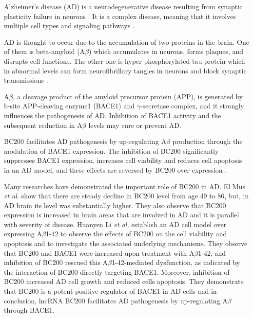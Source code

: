 \documentclass[conference]{IEEEtran}
\begin{document}
Alzheimer's disease (AD) is a neurodegenerative disease resulting from synaptic plasticity failure in neurons \cite{mus2007dendritic}. 
It is a complex disease, meaning that it involves multiple cell types and signaling pathways \cite{zhang2021role}.

AD is thought to occur due to the accumulation of two proteins in the brain. 
One of them is beta-amyloid (A$\beta$) which accumulates in neurons, forms plaques, and disrupts cell functions. 
The other one is hyper-phosphorylated tau protein which in abnormal levels can form neurofibrillary tangles in neurons and block synaptic transmissions \cite{zhang2021role}.

A$\beta$, a cleavage product of the amyloid precursor protein (APP), is generated by b-site APP-cleaving enzyme1 (BACE1) and $\gamma$-secretase complex, and it strongly influences the pathogenesis of AD. 
Inhibition of BACE1 activity and the subsequent reduction in A$\beta$ levels may cure or prevent AD\cite{li2018identification,zhang2021role}.

BC200 facilitates AD pathogenesis by up-regulating A$\beta$ production through the modulation of BACE1 expression. 
The inhibition of BC200 significantly suppresses BACE1 expression, increases cell viability and reduces cell apoptosis in an AD model, and these effects are reversed by BC200 over-expression \cite{li2018identification,zhang2021role}.

Many researches have demonstrated the important role of BC200 in AD. 
El Mus \emph{et al.} \cite{mus2007dendritic} show that there are steady decline in BC200 level from age 49 to 86, but, in AD brain its level was substantially higher. 
They also observe that BC200 expression is increased in brain areas that are involved in AD and it is parallel with severity of disease. 
Huanyen Li \emph{et al.} \cite{li2018identification} establish an AD cell model over expressing A$\beta$1-42 to observe the effects of BC200 on the cell viability and apoptosis and to investigate the associated underlying mechanisms. 
They observe that BC200 and BACE1 were increased upon treatment with A$\beta$1-42, and inhibition of BC200 rescued this A$\beta$1-42-mediated dysfunction, as indicated by the interaction of BC200 directly targeting BACE1. 
Moreover, inhibition of BC200 increased AD cell growth and reduced cells apoptosis. 
They demonstrate that BC200 is a potent positive regulator of BACE1 in AD cells and in conclusion, lncRNA BC200 facilitates AD pathogenesis by up-regulating A$\beta$ through BACE1.  					 			 		 	 
\end{document}
